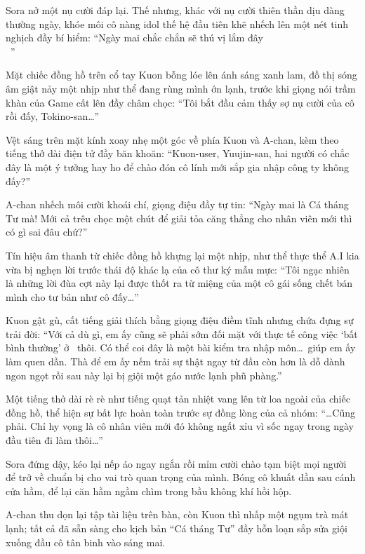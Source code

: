 \documentclass[../main.tex]{subfiles}
\begin{document}
Sora nở một nụ cười đáp lại. Thế nhưng, khác với nụ cười thiên thần dịu dàng thường ngày, khóe môi cô nàng idol thế hệ đầu tiên khẽ nhếch lên một nét tinh nghịch đầy bí hiểm: ``Ngày mai chắc chắn sẽ thú vị lắm đây\\~{}{}''

Mặt chiếc đồng hồ trên cổ tay Kuon bỗng lóe lên ánh sáng xanh lam, đồ thị sóng âm giật nảy một nhịp như thể đang rùng mình ớn lạnh, trước khi giọng nói trầm khàn của Game cất lên đầy châm chọc: ``Tôi bắt đầu cảm thấy sợ nụ cười của cô rồi đấy, Tokino-san\dots''

Vệt sáng trên mặt kính xoay nhẹ một góc về phía Kuon và A-chan, kèm theo tiếng thở dài điện tử đầy băn khoăn: ``Kuon-user, Yuujin-san, hai người có chắc đây là một ý tưởng hay ho để chào đón cô lính mới sắp gia nhập công ty không đấy?''

A-chan nhếch môi cười khoái chí, giọng điệu đầy tự tin: ``Ngày mai là Cá tháng Tư mà! Mới cả trêu chọc một chút để giải tỏa căng thẳng cho nhân viên mới thì có gì sai đâu chứ?''

Tín hiệu âm thanh từ chiếc đồng hồ khựng lại một nhịp, như thể thực thể A.I kia vừa bị nghẹn lời trước thái độ khác lạ của cô thư ký mẫu mực: ``Tôi ngạc nhiên là những lời đùa cợt này lại được thốt ra từ miệng của một cô gái sống chết bán mình cho tư bản như cô đấy\dots''

Kuon gật gù, cất tiếng giải thích bằng giọng điệu điềm tĩnh nhưng chứa đựng sự trải đời: ``Với cả dù gì, em ấy cũng sẽ phải sớm đối mặt với thực tế công việc `bất bình thường' ở \hll\ thôi. Có thể coi đây là một bài kiểm tra nhập môn\dots\ giúp em ấy làm quen dần. Thà để em ấy nếm trải sự thật ngay từ đầu còn hơn là dỗ dành ngon ngọt rồi sau này lại bị giội một gáo nước lạnh phũ phàng.''

Một tiếng thở dài rè rè như tiếng quạt tản nhiệt vang lên từ loa ngoài của chiếc đồng hồ, thể hiện sự bất lực hoàn toàn trước sự đồng lòng của cả nhóm: ``\dots Cũng phải. Chỉ hy vọng là cô nhân viên mới đó không ngất xỉu vì sốc ngay trong ngày đầu tiên đi làm thôi\dots''

Sora đứng dậy, kéo lại nếp áo ngay ngắn rồi mỉm cười chào tạm biệt mọi người để trở về chuẩn bị cho vai trò quan trọng của mình. Bóng cô khuất dần sau cánh cửa hầm, để lại căn hầm ngầm chìm trong bầu không khí hồi hộp.

A-chan thu dọn lại tập tài liệu trên bàn, còn Kuon thì nhấp một ngụm trà mát lạnh; tất cả đã sẵn sàng cho kịch bản ``Cá tháng Tư'' đầy hỗn loạn sắp sửa giội xuống đầu cô tân binh vào sáng mai.
\end{document}
